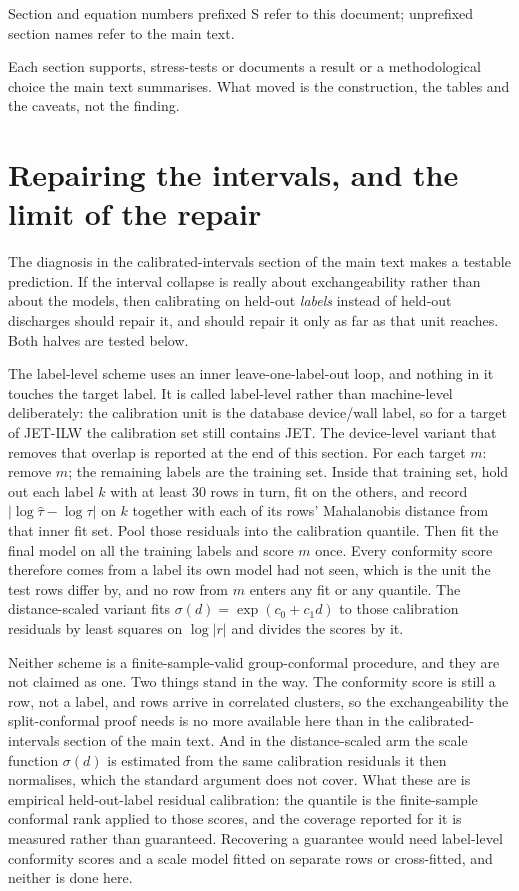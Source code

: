\documentclass[12pt,letterpaper]{article}
\begin{document}
Section and equation numbers prefixed S refer to this document; unprefixed
section names refer to the main text.

Each section supports, stress-tests or documents a result or a methodological
choice the main text summarises. What moved is the construction, the tables
and the caveats, not the finding.

\section{Repairing the intervals, and the limit of the repair}
\label{supp:shift}

The diagnosis in the calibrated-intervals section of the main text makes a testable prediction. If the interval collapse
is really about exchangeability rather than about the models, then calibrating
on held-out \emph{labels} instead of held-out discharges should repair it, and
should repair it only as far as that unit reaches. Both halves are tested below.

The label-level scheme uses an inner leave-one-label-out loop, and nothing in
it touches the target label. It is called label-level rather than machine-level
deliberately: the calibration unit is the database device/wall label, so for a
target of JET-ILW the calibration set still contains JET. The device-level
variant that removes that overlap is reported at the end of this section. For
each target $m$: remove $m$; the remaining labels are the training set. Inside
that training set, hold out each label $k$ with at least 30 rows in turn, fit on the others, and record
$\lvert \log\hat\tau - \log\tau \rvert$ on $k$ together with each of its rows'
Mahalanobis distance from that inner fit set. Pool those residuals into the
calibration quantile. Then fit the final model on all the training labels and
score $m$ once. Every conformity score therefore comes from a label its own
model had not seen, which is the unit the test rows differ by, and no row from
$m$ enters any fit or any quantile. The distance-scaled variant fits
$\sigma(d)=\exp(c_0 + c_1 d)$ to those calibration residuals by least squares on
$\log\lvert r \rvert$ and divides the scores by it.

Neither scheme is a finite-sample-valid group-conformal procedure, and they are
not claimed as one. Two things stand in the way. The conformity score is still a
row, not a label, and rows arrive in correlated clusters, so the exchangeability
the split-conformal proof needs is no more available here than in
the calibrated-intervals section of the main text. And in the distance-scaled arm the scale function
$\sigma(d)$ is estimated from the same calibration residuals it then normalises,
which the standard argument does not cover. What these are is empirical
held-out-label residual calibration: the quantile is the finite-sample
conformal rank applied to those scores, and the coverage reported for it is
measured rather than guaranteed. Recovering a guarantee would need
label-level conformity scores and a scale model fitted on separate rows or
cross-fitted, and neither is done here.
\end{document}
